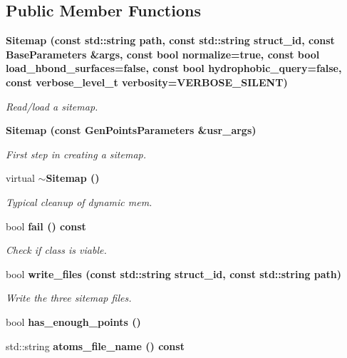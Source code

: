 \subsection*{Public Member Functions}
\begin{CompactItemize}
\item 
\bf{Sitemap} (const std::string path, const std::string struct\_\-id, const \bf{Base\-Parameters} \&args, const bool normalize=true, const bool load\_\-hbond\_\-surfaces=false, const bool hydrophobic\_\-query=false, const verbose\_\-level\_\-t verbosity=VERBOSE\_\-SILENT)\label{classSimSite3D_1_1Sitemap_50c5a65ec5c3b1e196466431ab71637a}

\begin{CompactList}\small\item\em Read/load a sitemap. \item\end{CompactList}\item 
\bf{Sitemap} (const \bf{Gen\-Points\-Parameters} \&usr\_\-args)\label{classSimSite3D_1_1Sitemap_fc5a254b492d94440c55970ef63386f2}

\begin{CompactList}\small\item\em First step in creating a sitemap. \item\end{CompactList}\item 
virtual \bf{$\sim$Sitemap} ()\label{classSimSite3D_1_1Sitemap_efd8a95708982d72800caf7f69073700}

\begin{CompactList}\small\item\em Typical cleanup of dynamic mem. \item\end{CompactList}\item 
bool \bf{fail} () const 
\begin{CompactList}\small\item\em Check if class is viable. \item\end{CompactList}\item 
bool \bf{write\_\-files} (const std::string struct\_\-id, const std::string path)\label{classSimSite3D_1_1Sitemap_88720d257d371462b7fc1b8c797aa697}

\begin{CompactList}\small\item\em Write the three sitemap files. \item\end{CompactList}\item 
bool \bf{has\_\-enough\_\-points} ()
\item 
std::string \bf{atoms\_\-file\_\-name} () const \label{classSimSite3D_1_1Sitemap_aaf9fd841e8f5a03b2b7b756240bbe82}


\end{CompactItemize}
